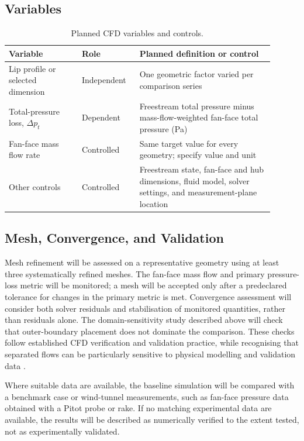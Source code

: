 \documentclass[11pt]{article}
\begin{document}
\subsection{Variables}
\begin{table}[htbp]
    \centering
    
    \label{tab:variables}
    \begin{tabular}{p{0.25\linewidth}p{0.19\linewidth}p{0.46\linewidth}}
        \toprule
        Variable & Role & Planned definition or control \\
        \midrule
        Lip profile or selected dimension & Independent & One geometric factor varied per comparison series \\
        Total-pressure loss, $\Delta p_t$ & Dependent & Freestream total pressure minus mass-flow-weighted fan-face total pressure (Pa) \\
        Fan-face mass flow rate & Controlled & Same target value for every geometry; specify value and unit \\
        Other controls & Controlled & Freestream state, fan-face and hub dimensions, fluid model, solver settings, and measurement-plane location \\
        \bottomrule
    \end{tabular}
    \caption{Planned CFD variables and controls.}
\end{table}

\subsection{Mesh, Convergence, and Validation}
Mesh refinement will be assessed on a representative geometry using at least three systematically refined meshes. The fan-face mass flow and primary pressure-loss metric will be monitored; a mesh will be accepted only after a predeclared tolerance for changes in the primary metric is met. Convergence assessment will consider both solver residuals and stabilisation of monitored quantities, rather than residuals alone. The domain-sensitivity study described above will check that outer-boundary placement does not dominate the comparison. These checks follow established CFD verification and validation practice, while recognising that separated flows can be particularly sensitive to physical modelling and validation data \cite{morrison2014,slater2025}.

Where suitable data are available, the baseline simulation will be compared with a benchmark case or wind-tunnel measurements, such as fan-face pressure data obtained with a Pitot probe or rake. If no matching experimental data are available, the results will be described as numerically verified to the extent tested, not as experimentally validated.
\end{document}
